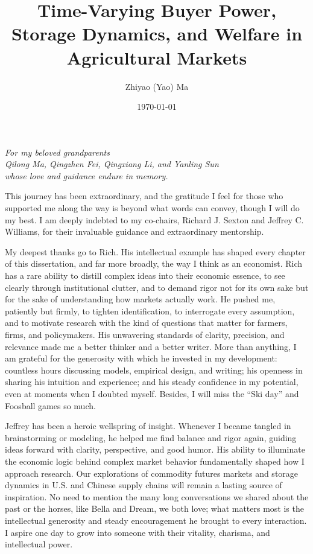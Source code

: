 \documentclass[12pt,authoryear, notitlepage]{elegantpaper}
\title{Time-Varying Buyer Power, Storage Dynamics, and Welfare in Agricultural Markets}
\author{Zhiyao (Yao) Ma}
\institute{Committee: Richard J. Sexton, Jeffrey C. Williams, and Stephen Boucher}
\date{\today}
\begin{document}


\maketitle
\thispagestyle{empty}


\begin{dedication}
\textit{For my beloved grandparents}\\
\textit{Qilong Ma, Qingzhen Fei, Qingxiang Li, and Yanling Sun}\\
\textit{whose love and guidance endure in memory.}
\end{dedication}


\newpage
{}


\begin{acknowledgments}
This journey has been extraordinary, and the gratitude I feel for those who supported me along the way is beyond what words can convey, though I will do my best. I am deeply indebted to my co-chairs, Richard J. Sexton and Jeffrey C. Williams, for their invaluable guidance and extraordinary mentorship.

My deepest thanks go to Rich. His intellectual example has shaped every chapter of this dissertation, and far more broadly, the way I think as an economist. Rich has a rare ability to distill complex ideas into their economic essence, to see clearly through institutional clutter, and to demand rigor not for its own sake but for the sake of understanding how markets actually work. He pushed me, patiently but firmly, to tighten identification, to interrogate every assumption, and to motivate research with the kind of questions that matter for farmers, firms, and policymakers. His unwavering standards of clarity, precision, and relevance made me a better thinker and a better writer. More than anything, I am grateful for the generosity with which he invested in my development: countless hours discussing models, empirical design, and writing; his openness in sharing his intuition and experience; and his steady confidence in my potential, even at moments when I doubted myself. Besides, I will miss the ``Ski day'' and Foosball games so much.

Jeffrey has been a heroic wellspring of insight. Whenever I became tangled in brainstorming or modeling, he helped me find balance and rigor again, guiding ideas forward with clarity, perspective, and good humor. His ability to illuminate the economic logic behind complex market behavior fundamentally shaped how I approach research. Our explorations of commodity futures markets and storage dynamics in U.S. and Chinese supply chains will remain a lasting source of inspiration. No need to mention the many long conversations we shared about the past or the horses, like Bella and Dream, we both love; what matters most is the intellectual generosity and steady encouragement he brought to every interaction. I aspire one day to grow into someone with their vitality, charisma, and intellectual power.


\end{acknowledgments}
\end{document}
